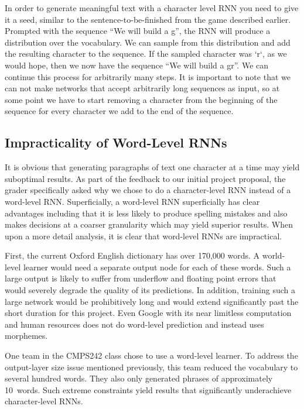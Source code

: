 \documentclass{article}
\begin{document}
In order to generate meaningful text with a character level RNN you need to give it a seed, similar to the sentence-to-be-finished from the game described earlier. Prompted with the sequence ``We will build a g'', the RNN will produce a distribution over the vocabulary. We can sample from this distribution and add the resulting character to the sequence. If the sampled character was `r`, as we would hope, then we now have the sequence ``We will build a gr''. We can continue this process for arbitrarily many steps. It is important to note that we can not make networks that accept arbitrarily long sequences as input, so at some point we have to start removing a character from the beginning of the sequence for every character we add to the end of the sequence.

\subsection{Impracticality of Word-Level RNNs}

It is obvious that generating paragraphs of text one character at a time may yield suboptimal results.  As part of the feedback to our initial project proposal, the grader specifically asked why we chose to do a character-level RNN instead of a word-level RNN.  Superficially, a word-level RNN superficially has clear advantages including that it is less likely to produce spelling mistakes and also makes decisions at a coarser granularity which may yield superior results.  When upon a more detail analysis, it is clear that word-level RNNs are impractical.

First, the current Oxford English dictionary has over 170,000 words. A world-level learner would need a separate output node for each of these words.  Such a large output is likely to suffer from underflow and floating point errors that would severely degrade the quality of its predictions.  In addition, training such a large network would be prohibitively long and would extend significantly past the short duration for this project.  Even Google with its near limitless computation and human resources does not do word-level prediction and instead uses morphemes.

One team in the CMPS242 class chose to use a word-level learner.  To address the output-layer size issue mentioned previously, this team reduced the vocabulary to several hundred words.  They also only generated phrases of approximately 10~words.  Such extreme constraints yield results that significantly underachieve character-level RNNs.
\end{document}
